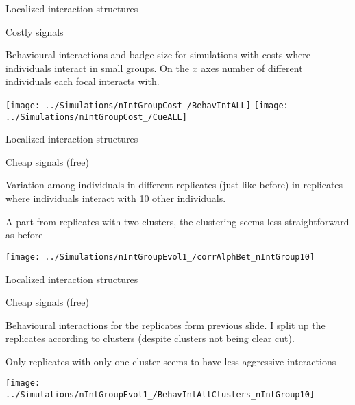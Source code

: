 \documentclass[
  ignorenonframetext,
]{beamer}
\begin{document}
\begin{frame}{Localized interaction structures}
\protect\hypertarget{localized-interaction-structures}{}

\begin{block}{Costly signals}

\tiny

Behavioural interactions and badge size for simulations with costs where
individuals interact in small groups. On the \(x\) axes number of
different individuals each focal interacts with.

\begin{center}\texttt{[image: ../Simulations/nIntGroupCost\_/BehavIntALL]} \texttt{[image: ../Simulations/nIntGroupCost\_/CueALL]} \end{center}

\end{block}

\end{frame}

\begin{frame}{Localized interaction structures}
\protect\hypertarget{localized-interaction-structures-1}{}

\begin{block}{Cheap signals (free)}

\small

Variation among individuals in different replicates (just like before)
in replicates where individuals interact with 10 other individuals.

A part from replicates with two clusters, the clustering seems less
straightforward as before

\begin{center}\texttt{[image: ../Simulations/nIntGroupEvol1\_/corrAlphBet\_nIntGroup10]} \end{center}

\end{block}

\end{frame}

\begin{frame}{Localized interaction structures}
\protect\hypertarget{localized-interaction-structures-2}{}

\begin{block}{Cheap signals (free)}

\small

Behavioural interactions for the replicates form previous slide. I split
up the replicates according to clusters (despite clusters not being
clear cut).

Only replicates with only one cluster seems to have less aggressive
interactions

\begin{center}\texttt{[image: ../Simulations/nIntGroupEvol1\_/BehavIntAllClusters\_nIntGroup10]} \end{center}

\end{block}

\end{frame}
\end{document}
